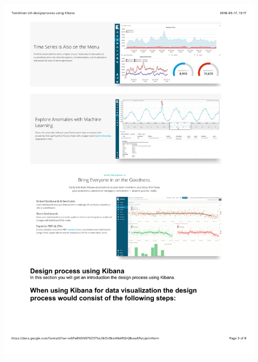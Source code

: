\documentclass[12pt]{kththesis}
\begin{document}
\begin{appendices}
\includegraphics[width=1\textwidth]{UX_designprocess3.pdf}

\end{appendices}
\end{document}
